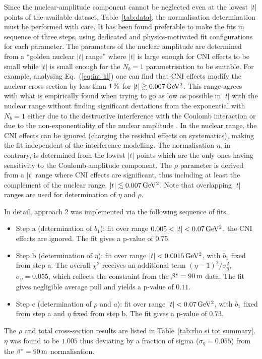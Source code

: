 Since the nuclear-amplitude component cannot be neglected even at the lowest $|t|$ points of the available dataset, Table~\ref{tab:data}, the normalisation determination must be performed with care. It has been found preferable to make the fits in sequence of three steps, using dedicated and physics-motivated fit configurations for each parameter. The parameters of the nuclear amplitude are determined from a ``golden nuclear $|t|$ range'' where $|t|$ is large enough for CNI effects to be small while $|t|$ is small enough for the $N_b = 1$ parametrisation to be suitable. For example, analysing Eq.~(\ref{eq:int kl}) one can find that CNI effects modify the nuclear cross-section by less than $1\,{\rm \%}$ for $|t| \gtrsim 0.007\,{\rm GeV^2}$. This range agrees with what is empirically found when trying to go as low as possible in $|t|$ with the nuclear range without finding significant deviations from the exponential with $N_b = 1$ either due to the destructive interference with the Coulomb interaction or due to the non-exponentiality of the nuclear amplitude \cite{totem-8tev-90m}. In the nuclear range, the CNI effects can be ignored (charging the residual effects on systematics), making the fit independent of the interference modelling. The normalisation $\eta$, in contrary, is determined from the lowest $|t|$ points which are the only ones having sensitivity to the Coulomb-amplitude component. The $\rho$ parameter is derived from a $|t|$ range where CNI effects are significant, thus including at least the complement of the nuclear range, $|t| \lesssim 0.007\,{\rm GeV^2}$. Note that overlapping $|t|$ ranges are used for determination of $\eta$ and $\rho$.

In detail, approach 2 was implemented via the following sequence of fits.
\begin{itemize}
\item Step a (determination of $b_1$): fit over range $0.005 < |t| < 0.07\,{\rm GeV^2}$, the CNI effects are ignored. The fit gives a p-value of $0.75$.
\item Step b (determination of $\eta$): fit over range $|t| < 0.0015\,{\rm GeV^2}$, with $b_1$ fixed from step a. The overall $\chi^2$ receives an additional term $(\eta - 1)^2/ \sigma_\eta^2$, $\sigma_\eta = 0.055$, which reflects the constraint from the $\beta^* = 90\,{\rm m}$ data. The fit gives negligible average pull and yields a p-value of $0.11$.
\item Step c (determination of $\rho$ and $a$): fit over range $|t| < 0.07\,{\rm GeV^2}$, with $b_1$ fixed from step a and $\eta$ fixed from step b. The fit gives a p-value of $0.73$.
\end{itemize}
The $\rho$ and total cross-section results are listed in Table~\ref{tab:rho si tot summary}. $\eta$ was found to be $1.005$ thus deviating by a fraction of sigma ($\sigma_\eta = 0.055$) from the $\beta^* = 90\,{\rm m}$ normalisation.

